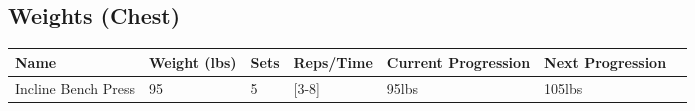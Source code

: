 \documentclass{article}
\begin{document}
\subsection*{Weights (Chest)}
\begin{table}[H]
\begin{tabular}{lllllll}
\hline
\textbf{Name}    & \textbf{Weight (lbs)} & \textbf{Sets} & \multicolumn{1}{l}{\textbf{Reps/Time}} & \multicolumn{1}{l}{\textbf{Current Progression}} & \multicolumn{1}{l}{\textbf{Next Progression}}\\ \hline
 Incline Bench Press&95&5&[3-8]&95lbs&105lbs\\\end{tabular}
\end{table}
\end{document}

